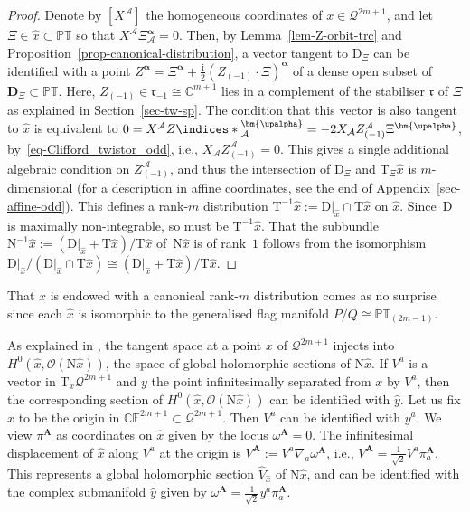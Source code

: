 \documentclass[10pt,a4paper]{amsart}
\numberwithin{equation}{section}
\newcommand{\mbf} [1]{\mathbf{#1}}
\newcommand{\mc} [1]{\mathcal{#1}}
\newcommand{\Drm} {{\mathrm{D}}}
\newcommand{\ii} {\mathrm{i}}
\newcommand{\ind} {\indices}
\newcommand{\Tgt} {\mathrm{T}}
\newcommand{\Nrm} {\mathrm{N}}
\newcommand{\mfr} {\mathfrak{r}}
\newcommand{\PT} {\mathbb{PT}}
\newcommand{\E} {\mathbb{E}}
\newcommand{\C} {\mathbb{C}}
\begin{document}
\begin{proof}
Denote by $[X^\mc{A}]$ the homogeneous coordinates of $x \in \mc{Q}^{2m+1}$, and let $\Xi \in \hat{x} \subset \PT$ so that $X^\mc{A} \Xi_\mc{A}^{\bm{\upalpha}} =0$. Then, by Lemma~\ref{lem-Z-orbit-trc} and Proposition~\ref{prop-canonical-distribution}, a vector tangent to $\Drm_\Xi$ can be identif\/ied with a point $Z^{\bm{\upalpha}} = \Xi^{\bm{\upalpha}} + \frac{\ii}{2} ( Z_{(-1)} \cdot \Xi )^{\bm{\upalpha}}$ of a dense open subset of $\mbf{D}_\Xi \subset \PT$. Here, $Z_{(-1)} \in \mfr_{-1} \cong \C^{m+1}$ lies in a complement of the stabiliser $\mfr$ of $\Xi$ as explained in Section~\ref{sec-tw-sp}. The condition that this vector is also tangent to $\hat{x}$ is equivalent to $0 = X^\mc{A} Z \ind*{_{\mc{A}}^{\bm{\upalpha}}} = - 2 X_\mc{A} Z^\mc{A}_{(-1)} \Xi^{\bm{\upalpha}}$, by~\eqref{eq-Clifford_twistor_odd}, i.e., $X_\mc{A} Z^\mc{A}_{(-1)} =0$. This gives a single additional algebraic condition on $Z_{(-1)}^\mc{A}$, and thus the intersection of $\mathrm{D}_\Xi$ and $\Tgt_\Xi \hat{x}$ is $m$-dimensional (for a description in af\/f\/ine coordinates, see the end of Appendix~\ref{sec-affine-odd}). This def\/ines a rank-$m$ distribution $\Tgt^{-1} \hat{x} := \mathrm{D} |_{\hat{x}} \cap \Tgt \hat{x}$ on $\hat{x}$. Since~$\mathrm{D}$ is maximally non-integrable, so must be $\Tgt^{-1} \hat{x}$. That the subbundle $\Nrm^{-1} \hat{x} := ( \mathrm{D} |_{\hat{x}} + \Tgt \hat{x})/\Tgt \hat{x}$ of~$\mathrm{N} \hat{x}$ is of rank~$1$ follows from the isomorphism $ \mathrm{D}|_{\hat{x}} /( \mathrm{D} |_{\hat{x}} \cap \Tgt \hat{x} ) \cong ( \mathrm{D} |_{\hat{x}} + \Tgt \hat{x} )/\Tgt \hat{x}$.
\end{proof}

That $\hat{x}$ is endowed with a canonical rank-$m$ distribution comes as no surprise since each $\hat{x}$ is isomorphic to the generalised f\/lag manifold $P/Q \cong \PT_{(2m-1)}$.

As explained in \cite{Kodaira1962}, the tangent space at a point $x$ of $\mc{Q}^{2m+1}$ injects into $H^0(\hat{x}, \mc{O}(\Nrm \hat{x}))$, the space of global holomorphic sections of $\Nrm \hat{x}$. If $V^a$ is a vector in $\Tgt_x \mc{Q}^{2m+1}$ and $y$ the point inf\/initesimally separated from $x$ by $V^a$, then the corresponding section of $H^0(\hat{x}, \mc{O}(\Nrm \hat{x}))$ can be identif\/ied with $\hat{y}$. Let us f\/ix $x$ to be the origin in $\C\E^{2m+1} \subset \mc{Q}^{2m+1}$. Then $V^a$ can be identif\/ied with $y^a$. We view $\pi^{\mbf{A}}$ as coordinates on $\hat{x}$ given by the locus $\omega^{\mbf{A}}=0$. The inf\/initesimal displacement of $\hat{x}$ along $V^a$ at the origin is $V^\mbf{A} := V^a \nabla_a \omega^{\mbf{A}}$, i.e., $V^\mbf{A} = \frac{1}{\sqrt{2}} V^a \pi_a^\mbf{A}$. This represents a global holomorphic section $\widehat{V}_{\hat{x}}$ of $\Nrm \hat{x}$, and can be identif\/ied with the complex submanifold $\hat{y}$ given by $\omega^{\mbf{A}} = \frac{1}{\sqrt{2}} y^a \pi_a^{\mbf{A}}$.
\end{document}
